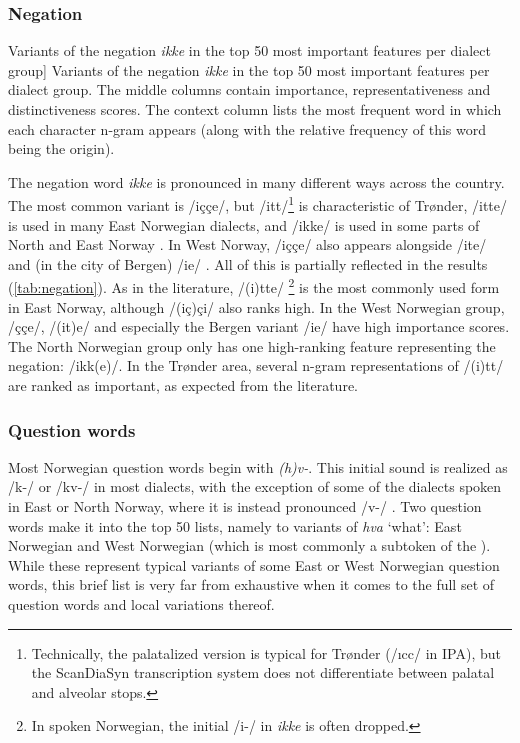 \subsubsection{Negation}

\begin{table}[htbp]
    
    \caption
    [Variants of the negation \textit{ikke} in the top 50 most important features per dialect group]
    {Variants of the negation \textit{ikke} in the top 50 most important features per dialect group.
    The middle columns contain importance, representativeness and distinctiveness scores.
    The context column lists the most frequent word in which each character n-gram appears (along with the relative frequency of this word being the origin).}
    \label{tab:negation}
\end{table}


The negation word \textit{ikke} is pronounced in many different ways across the country.
The most common variant is /i\c{c}\c{c}e/, but /itt/\footnote{%
Technically, the palatalized version is typical for Trønder (/\i{}cc/ in IPA), but the ScanDiaSyn transcription system does not differentiate between palatal and alveolar stops.
}
is characteristic of Trønder, /itte/ is used in many East Norwegian dialects, and /ikke/ is used in some parts of North and East Norway \cite[pp.~20--21]{jahr1990dialekter}.
In West Norway, /i\c{c}\c{c}e/ also appears alongside /ite/ and (in the city of Bergen) /i\textesh\textesh{}e/ \citep[pp.~91, 50]{maehlum2012dialektlandskapet}.
All of this is partially reflected in the results (\autoref{tab:negation}).
As in the literature, /(i)tte/%
\footnote{In spoken Norwegian, the initial /i-/ in \textit{ikke} is often dropped.}
is the most commonly used form in East Norway, although /(i\c{c})\c{c}i/ also ranks high.
In the West Norwegian group, /\c{c}\c{c}e/, /(it)e/ and especially the Bergen variant /i\textesh\textesh{}e/ have high importance scores.
The North Norwegian group only has one high-ranking feature representing the negation: /ikk(e)/.
In the Trønder area, several n-gram representations of /(i)tt/ are ranked as important, as expected from the literature.


\subsubsection{Question words}

Most Norwegian question words begin with \textit{(h)v-}.
This initial sound is realized as /k-/ or /kv-/ in most dialects, with the exception of some of the dialects spoken in East or North Norway, where it is instead pronounced /v-/ \cite[pp.~79--80]{sandoey1991dialektkunnskap}.
Two question words make it into the top 50 lists, namely to variants of \textit{hva} `what': East Norwegian  and West Norwegian  (which is most commonly a subtoken of the ).
While these represent typical variants of some East or West Norwegian question words, this brief list is very far from exhaustive when it comes to the full set of question words and local variations thereof.

